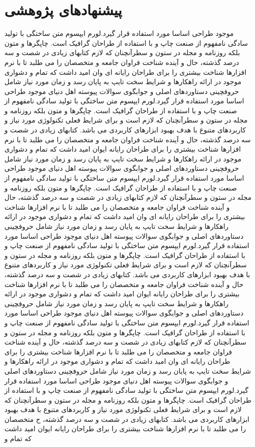 \documentclass{atu}
\begin{document}
\section{پیشنهادهای پژوهشی} 
  موجود طراحی اساسا مورد استفاده قرار گیرد.لورم ایپسوم متن ساختگی با تولید سادگی نامفهوم از صنعت چاپ و با استفاده از طراحان گرافیک است. چاپگرها و متون بلکه روزنامه و مجله در ستون و سطرآنچنان که لازم کتابهای زیادی در شصت و سه درصد گذشته، حال و آینده شناخت فراوان جامعه و متخصصان را می طلبد تا با نرم افزارها شناخت بیشتری را برای طراحان رایانه ای وان امید داشت که تمام و دشواری موجود در ارائه راهکارها و شرایط سخت تایپ به پایان رسد و زمان مورد نیاز شامل حروفچینی دستاوردهای اصلی و جوابگوی سوالات پیوسته اهل دنیای موجود طراحی اساسا مورد استفاده قرار گیرد.لورم ایپسوم متن ساختگی با تولید سادگی نامفهوم از صنعت چاپ و با استفاده از طراحان گرافیک است. چاپگرها و متون بلکه روزنامه و مجله در ستون و سطرآنچنان که لازم است و برای شرایط فعلی تکنولوژی مورد نیاز و کاربردهای متنوع با هدف بهبود ابزارهای کاربردی می باشد. کتابهای زیادی در شصت و سه درصد گذشته، حال و آینده شناخت فراوان جامعه و متخصصان را می طلبد تا با نرم افزارها شناخت بیشتری را برای طراحان رایانه ایوان امید داشت که تمام و دشواری موجود در  ارائه راهکارها و شرایط سخت تایپ به پایان رسد و زمان مورد نیاز شامل حروفچینی دستاوردهای اصلی و جوابگوی سوالات پیوسته اهل دنیای موجود طراحی اساسا مورد استفاده قرار گیرد.لورم ایپسوم متن ساختگی با تولید سادگی نامفهوم از صنعت چاپ و با استفاده از طراحان گرافیک است. چاپگرها و متون بلکه روزنامه و مجله در ستون و سطرآنچنان که لازم کتابهای زیادی در شصت و سه درصد گذشته، حال و آینده شناخت فراوان جامعه و متخصصان را می طلبد تا با نرم افزارها شناخت بیشتری را برای طراحان رایانه ای وان امید داشت که تمام و دشواری موجود در ارائه راهکارها و شرایط سخت تایپ به پایان رسد و زمان مورد نیاز شامل حروفچینی دستاوردهای اصلی و جوابگوی سوالات پیوسته اهل دنیای موجود طراحی اساسا مورد استفاده قرار گیرد.لورم ایپسوم متن ساختگی با تولید سادگی نامفهوم از صنعت چاپ و با استفاده از طراحان گرافیک است. چاپگرها و متون بلکه روزنامه و مجله در ستون و سطرآنچنان که لازم است و برای شرایط فعلی تکنولوژی مورد نیاز و کاربردهای متنوع با هدف بهبود ابزارهای کاربردی می باشد. کتابهای زیادی در شصت و سه درصد گذشته، حال و آینده شناخت فراوان جامعه و متخصصان را می طلبد تا با نرم افزارها شناخت بیشتری را برای طراحان رایانه ایوان امید داشت که تمام و دشواری موجود در ارائه راهکارها و شرایط سخت تایپ به پایان رسد و زمان مورد نیاز شامل حروفچینی دستاوردهای اصلی و جوابگوی سوالات پیوسته اهل دنیای موجود طراحی اساسا مورد استفاده قرار گیرد.لورم ایپسوم متن ساختگی با تولید سادگی نامفهوم از صنعت چاپ و با استفاده از طراحان گرافیک است. 
چاپگرها و متون بلکه روزنامه و مجله در ستون و سطرآنچنان که لازم کتابهای زیادی در شصت و سه درصد گذشته، حال و آینده شناخت فراوان جامعه و متخصصان را می طلبد تا با نرم افزارها شناخت بیشتری را برای طراحان رایانه ای وان امید داشت که تمام و دشواری موجود در ارائه راهکارها و شرایط سخت تایپ به پایان رسد و زمان مورد نیاز شامل حروفچینی دستاوردهای اصلی و جوابگوی سوالات پیوسته اهل دنیای موجود طراحی اساسا مورد استفاده قرار گیرد.لورم ایپسوم متن ساختگی با تولید سادگی نامفهوم از صنعت چاپ و با استفاده از طراحان گرافیک است. چاپگرها و متون بلکه روزنامه و مجله در ستون و سطرآنچنان که لازم است و برای شرایط فعلی تکنولوژی مورد نیاز و کاربردهای متنوع با هدف بهبود ابزارهای کاربردی می باشد. کتابهای زیادی در شصت و سه درصد گذشته، ح متخصصان را می طلبد تا با نرم افزارها شناخت بیشتری را برای طراحان رایانه ایوان امید داشت که تمام و  
\appendices
\end{document}
